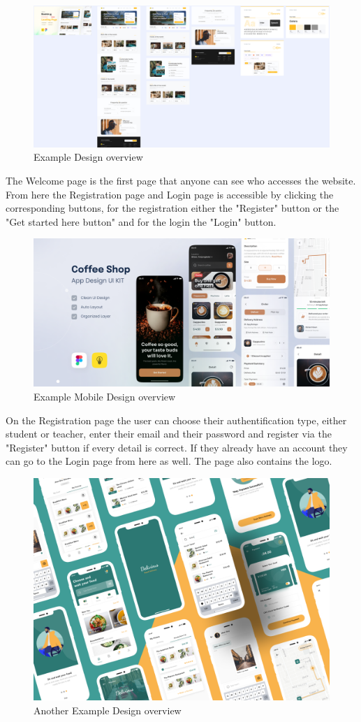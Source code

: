 \documentclass[12pt,a4paper]{article}
\begin{document}
\begin{spacing}{1.5}
    \begin{figure}[H]
        \centering
        \includegraphics[width=1\linewidth]{assets/design-overview-example.png}
        \caption{Example Design overview}
    \end{figure}
    \FloatBarrier

    \newpage
    The Welcome page is the first page that anyone can see who accesses the website. From here the Registration page and Login page is accessible by clicking the corresponding buttons, for the registration either the "Register" button or the "Get started here button" and for the login the "Login" button.

    \begin{figure}[H]
        \centering
        \includegraphics[width=0.6\linewidth]{assets/mobile-design-example.png}
        \caption{Example Mobile Design overview}
    \end{figure}
    \FloatBarrier

    On the Registration page the user can choose their authentification type,
    either student or teacher, enter their email and their password and register
    via the "Register" button if every detail is correct. If they already have an
    account they can go to the Login page from here as well. The page also contains
    the logo.

    \begin{figure}[H]
        \centering
        \includegraphics[width=0.6\linewidth]{assets/another-design-example.png}
        \caption{Another Example Design overview}
    \end{figure}
    \FloatBarrier


\end{spacing}
\end{document}
